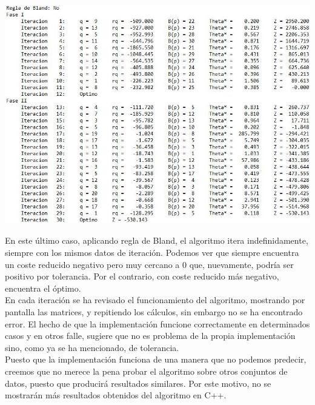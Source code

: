 \documentclass[12pt, titlepage]{article}
\begin{document}
\begin{center}
\includegraphics[scale=0.45]{imagenes/p2_no_bland.JPG}
\end{center}

En este último caso, aplicando regla de Bland, el algoritmo itera indefinidamente, siempre con los mismos datos de iteración. Podemos ver que siempre encuentra un coste reducido negativo pero muy cercano a $0$ que, nuevamente, podría ser positivo por tolerancia. Por el contrario, con coste reducido más negativo, encuentra el óptimo.\\
En cada iteración se ha revisado el funcionamiento del algoritmo, mostrando por pantalla las matrices, y repitiendo los cálculos, sin embargo no se ha encontrado error. El hecho de que la implementación funcione correctamente en determinados casos y en otros falle, sugiere que no es problema de la propia implementación sino, como ya se ha mencionado, de tolerancia.\\
Puesto que la implementación funciona de una manera que no podemos predecir, creemos que no merece la pena probar el algoritmo sobre otros conjuntos de datos, puesto que producirá resultados similares. Por este motivo, no se mostrarán más resultados obtenidos del algoritmo en C++.
\end{document}
